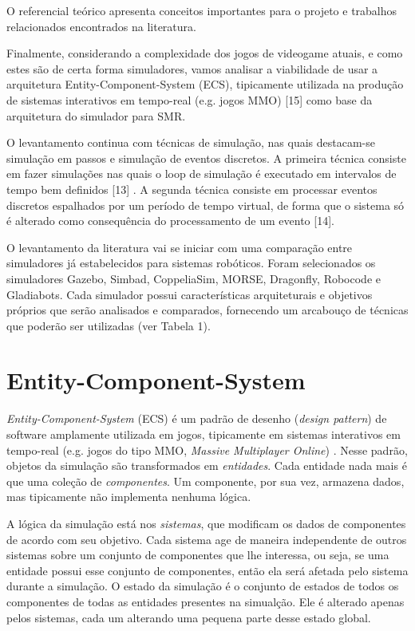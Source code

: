 \label{chapter:referencial}

O referencial teórico apresenta conceitos importantes para o projeto e trabalhos relacionados encontrados na literatura.

Finalmente, considerando a complexidade dos jogos de videogame atuais, e como estes são de certa forma simuladores, vamos analisar a viabilidade de usar a arquitetura Entity-Component-System (ECS), tipicamente utilizada na produção de sistemas interativos em tempo-real (e.g. jogos MMO) [15] como base da arquitetura do simulador para SMR.

O levantamento continua com técnicas de simulação, nas quais destacam-se simulação em passos e simulação de eventos discretos. A primeira técnica consiste em fazer simulações nas quais o loop de simulação é executado em intervalos de tempo bem definidos [13] . A segunda técnica consiste em processar eventos discretos espalhados por um período de tempo virtual, de forma que o sistema só é alterado como consequência do processamento de um evento [14].

O levantamento da literatura vai se iniciar com uma comparação entre simuladores já estabelecidos para sistemas robóticos. Foram selecionados os simuladores Gazebo, Simbad, CoppeliaSim, MORSE, Dragonfly, Robocode e Gladiabots. Cada simulador possui características arquiteturais e objetivos próprios que serão analisados e comparados, fornecendo um arcabouço de técnicas que poderão ser utilizadas (ver Tabela 1).

\section{Entity-Component-System}
\label{sec:ECS}

\textit{Entity-Component-System} (ECS) é um padrão de desenho (\textit{design pattern}) de software amplamente utilizada em jogos, tipicamente em sistemas interativos em tempo-real (e.g. jogos do tipo MMO, \textit{Massive Multiplayer Online}) \cite{wiebusch2015decoupling}. Nesse padrão, objetos da simulação são transformados em \textit{entidades}. Cada entidade nada mais é que uma coleção de \textit{componentes}. Um componente, por sua vez, armazena dados, mas tipicamente não implementa nenhuma lógica.

A lógica da simulação está nos \textit{sistemas}, que modificam os dados de componentes de acordo com seu objetivo. Cada sistema age de maneira independente de outros sistemas sobre um conjunto de componentes que lhe interessa, ou seja, se uma entidade possui esse conjunto de componentes, então ela será afetada pelo sistema durante a simulação. O estado da simulação é o conjunto de estados de todos os componentes de todas as entidades presentes na simualção. Ele é alterado apenas pelos sistemas, cada um alterando uma pequena parte desse estado global.

